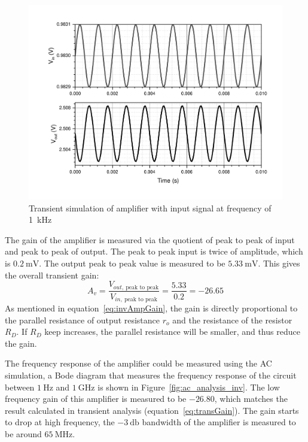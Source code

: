 \documentclass[12pt]{article}   %
\begin{document}
	\begin{figure}[htbp]
		\centering
		\includegraphics[width=0.7\linewidth]{Figures/E2_Inverting_Amplifier/Vin_Vout_1k}
		\caption{Transient simulation of amplifier with input signal at frequency of \SI{1}{\kilo\hertz}}
		\label{fig:tran1k}
	\end{figure}
	
	The gain of the amplifier is measured via the quotient of peak to peak of input and peak to peak of output. The peak to peak input is twice of amplitude, which is $\SI{0.2}{\milli\volt}$. The output peak to peak value is measured to be $\SI{5.33}{\milli\volt}$. This gives the overall transient gain:
	\begin{equation}
		A_v = \frac{V_{out,\ \text{peak to peak}}}{V_{in,\ \text{peak to peak}}} = \frac{5.33}{0.2} = -26.65
		\label{eq:transGain}
	\end{equation}
	As mentioned in equation~\eqref{eq:invAmpGain}, the gain is directly proportional to the parallel resistance of output resistance $r_o$ and the resistance of the resistor $R_D$. If $R_D$ keep increases, the parallel resistance will be smaller, and thus reduce the gain.
	
	The frequency response of the amplifier could be measured using the AC simulation, a Bode diagram that measures the frequency response of the circuit between $\SI{1}{\hertz}$ and $\SI{1}{\giga\hertz}$ is shown in Figure~\ref{fig:ac_analysis_inv}. The low frequency gain of this amplifier is measured to be $-26.80$, which matches the result calculated in transient analysis (equation~\eqref{eq:transGain}). The gain starts to drop at high frequency, the $\SI{-3}{\decibel}$ bandwidth of the amplifier is measured to be around $\SI{65}{\mega\hertz}$.
	
\end{document}
